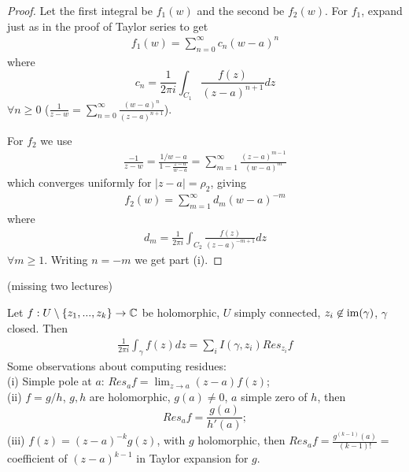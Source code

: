 \documentclass[a4paper]{article}
\begin{document}
\begin{thm}
\begin{proof}
Let the first integral be $f_1(w)$ and the second be $f_2(w)$. For $f_1$, expand just as in the proof of Taylor series to get
\begin{equation*}
\begin{aligned}
f_1(w) = \sum_{n=0}^\infty c_n (w-a)^n
\end{aligned}
\end{equation*}
where $$c_n = \frac{1}{2\pi i} \int_{C_1} \frac{f(z)}{(z-a)^{n+1}} dz$$ $\forall n \geq 0$ ($\frac{1}{z-w} = \sum_{n=0}^\infty \frac{(w-a)^n}{(z-a)^{n+1}}$).

For $f_2$ we use
\begin{equation*}
\begin{aligned}
\frac{-1}{z-w} = \frac{1/w-a}{1-\frac{z-a}{w-a}} = \sum_{m=1}^\infty \frac{(z-a)^{m-1}}{(w-a)^m}
\end{aligned}
\end{equation*}
which converges uniformly for $|z-a|=\rho_2$, giving
\begin{equation*}
\begin{aligned}
f_2(w) = \sum_{m=1}^\infty d_m (w-a)^{-m}
\end{aligned}
\end{equation*}
where
\begin{equation*}
\begin{aligned}
d_m = \frac{1}{2\pi i} \int_{C_2} \frac{f(z)}{(z-a)^{-m+1}} dz
\end{aligned}
\end{equation*}
$\forall m\geq 1$. Writing $n=-m$ we get part (i).
\end{proof}
\end{thm}

(missing two lectures)

Let $f:U \setminus \{z_1,...,z_k\} \to \mathbb{C}$ be holomorphic, $U$ simply connected, $z_i \not\in \operatorname{im}(\gamma)$, $\gamma$ closed. Then
\begin{equation*}
\begin{aligned}
\frac{1}{2\pi i} \int_\gamma f(z) dz = \sum_i I(\gamma,z_i) Res_{z_i} f
\end{aligned}
\end{equation*}
Some observations about computing residues:\\
(i) Simple pole at $a$: $Res_a f = \lim_{z \to a} (z-a) f(z)$;\\
(ii) $f = g/h$, $g,h$ are holomorphic, $g(a) \neq 0$, $a$ simple zero of $h$, then $$Res_a f = \frac{g(a)}{h'(a)};$$
(iii) $f(z) = (z-a)^{-k} g(z)$, with $g$ holomorphic, then $Res_a f = \frac{g^{(k-1)}(a)}{(k-1)!} = $ coefficient of $(z-a)^{k-1}$ in Taylor expansion for $g$.
\end{document}
